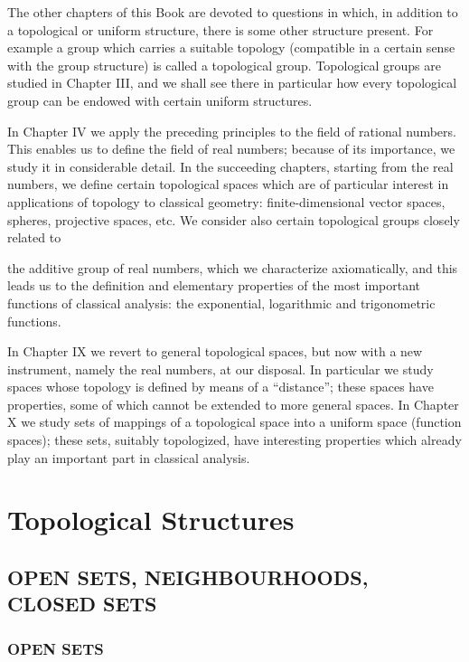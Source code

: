 The other chapters of this Book are devoted to questions in which, in addition to a topological or uniform structure, there is some other structure present. For example a group which carries a suitable topology (compatible in a certain sense with the group structure) is called a topological group. Topological groups are studied in Chapter III, and we shall see there in particular how every topological group can be endowed with certain uniform structures.

In Chapter IV we apply the preceding principles to the field of rational numbers. This enables us to define the field of real numbers; because of its importance, we study it in considerable detail. In the succeeding chapters, starting from the real numbers, we define certain topological spaces which are of particular interest in applications of topology to classical geometry: finite-dimensional vector spaces, spheres, projective spaces, etc. We consider also certain topological groups closely related to

the additive group of real numbers, which we characterize axiomatically, and this leads us to the definition and elementary properties of the most important functions of classical analysis: the exponential, logarithmic and trigonometric functions.

In Chapter IX we revert to general topological spaces, but now with a new instrument, namely the real numbers, at our disposal. In particular we study spaces whose topology is defined by means of a ``distance''; these spaces have properties, some of which cannot be extended to more general spaces. In Chapter X we study sets of mappings of a topological space into a uniform space (function spaces); these sets, suitably topologized, have interesting properties which already play an important part in classical analysis.

\chapter{Topological Structures}

\section{OPEN SETS, NEIGHBOURHOODS, CLOSED SETS}

\subsection{OPEN SETS}

